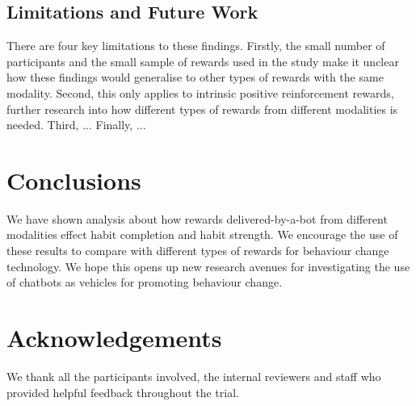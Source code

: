 \documentclass{scaffold/sigchi}
\begin{document}
\subsection{Limitations and Future Work}
There are four key limitations to these findings. Firstly, the small number of participants and the small sample of rewards used in the study make it unclear how these findings would generalise to other types of rewards with the same modality. Second, this only applies to intrinsic positive reinforcement rewards, further research into how different types of rewards from different modalities is needed. Third, ... Finally, ...


\section{Conclusions}


We have shown analysis about how rewards delivered-by-a-bot from different modalities effect habit completion and habit strength. We encourage the use of these results to compare with different types of rewards for behaviour change technology. We hope this opens up new research avenues for investigating the use of chatbots as vehicles for promoting behaviour change.


\section{Acknowledgements}
We thank all the participants involved, the internal reviewers and staff who provided helpful feedback throughout the trial.







\end{document}
